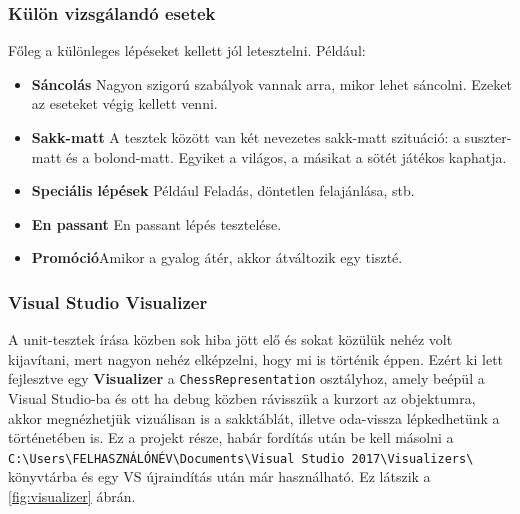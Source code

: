 \documentclass[twoside, a4paper, 12pt]{article}
\begin{document}
\subsubsection{Külön vizsgálandó esetek}
Főleg a különleges lépéseket kellett jól letesztelni. Például:
\begin{itemize}
	\item \textbf{Sáncolás} Nagyon szigorú szabályok vannak arra, mikor lehet sáncolni. Ezeket az eseteket végig kellett venni.
	
	\item \textbf{Sakk-matt} A tesztek között van két nevezetes sakk-matt szituáció: a suszter-matt és a bolond-matt. Egyiket a világos, a másikat a sötét játékos kaphatja.
	
	\item \textbf{Speciális lépések} Például Feladás, döntetlen felajánlása, stb.
	
	\item \textbf{En passant} En passant lépés tesztelése.
	
	\item \textbf{Promóció}Amikor a gyalog átér, akkor átváltozik egy tiszté.
\end{itemize}

\subsubsection{Visual Studio Visualizer}
A unit-tesztek írása közben sok hiba jött elő és sokat közülük nehéz volt kijavítani, mert nagyon nehéz elképzelni, hogy mi is történik éppen. Ezért ki lett fejlesztve egy \textbf{Visualizer} a \texttt{ChessRepresentation} osztályhoz, amely beépül a Visual Studio-ba és ott ha debug közben rávisszük a kurzort az objektumra, akkor megnézhetjük vizuálisan is a sakktáblát, illetve oda-vissza lépkedhetünk a történetében is. Ez a projekt része, habár fordítás után be kell másolni a \texttt{C:\textbackslash Users\textbackslash FELHASZNÁLÓNÉV\textbackslash Documents\textbackslash Visual Studio 2017\textbackslash Visualizers\textbackslash} könyvtárba és egy VS újraindítás után már használható. Ez látszik a \ref{fig:visualizer} ábrán.
\end{document}
